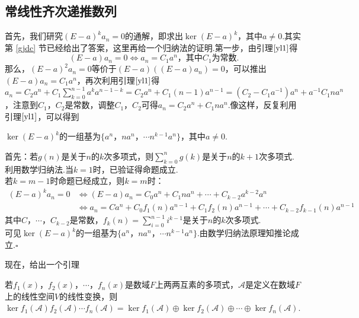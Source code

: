 \documentclass[10pt]{article}
\newcommand*{\QEDB}{\hfill\ensuremath{\square}}  %
\newcommand*{\D}{\text{，}}
\newcommand*{\SL}{\sum\limits}
\numberwithin{equation}{section}
\begin{document}
\subsection{常线性齐次递推数列}
\par 首先，我们研究$(E-a)^ka_n = 0$的通解，即求出$\ker (E-a)^k$，其中$a \ne 0$.其实第 \ref{gjdc} 节已经给出了答案，这里再给一个归纳法的证明.第一步，由引理$\ref{yl1}$得
$$
(E-a)a_n = 0 \Leftrightarrow a_n = C_1a^n \text{，其中$C_1$为常数.}
$$
那么，$(E-a)^2a_{n} = 0$等价于$(E-a)\left((E-a)a_n\right) = 0$，可以推出$(E-a)a_n = C_1a^n$，再次利用引理$\ref{yl1}$得$a_n = C_2a^n+C_1\SL_{k=0}^{n-1}{a^ka^{n-1-k}} = C_2a^n + C_1(n-1)a^{n-1} = (C_2-C_1a^{-1})a^{n} + a^{-1}C_1na^n$，注意到$C_1\D C_2$是常数，调整$C_1\D C_2$可得$a_n = C_2a^{n} + C_1na^{n}$.像这样，反复利用引理$\ref{yl1}$，可以得到
\begin{TL}
    $\ker (E-a)^k$的一组基为$\{a^n \D na^n \D \cdots n^{k-1}a^n\}$，其中$a\ne 0$.
\end{TL}
\begin{ZM}
    首先：若$g(n)$是关于$n$的$k$次多项式，则$\SL_{k=0}^{n}{g(k)}$是关于$n$的$k+1$次多项式.\\
    \indent 利用数学归纳法.当$k=1$时，已验证得命题成立.\\
    \indent 若$k=m-1$时命题已经成立，则$k=m$时：
    \[\begin{split}
            (E-a)^ka_n = 0 &\Leftrightarrow (E-a)a_n = C_0a^n+C_1na^n+\cdots+C_{k-2}a^{k-2}a^n \\
            &\Leftrightarrow a_n = Ca^n + C_0f_1(n)a^{n-1} + C_1f_2(n)a^{n-1}+ \cdots + C_{k-2}f_{k-1}(n)a^{n-1}
    \end{split}\]
    其中$C\D \cdots \D C_{k-2}$是常数，$f_{k}(n) = \SL_{i=0}^{n-1}{i^{k-1}}$是关于$n$的$k$次多项式.\\
    \indent 可见$\ker (E-a)^{k}$的一组基为$\{a^n \D na^n \D \cdots n^{k-1}a^n\}$.由数学归纳法原理知推论成立.\QEDB
\end{ZM}
现在，给出一个引理
\begin{YL}\label{yl2}
    若$f_1(x)\D f_2(x)\D \cdots\D f_n(x)$是数域$F$上两两互素的多项式，$\mathscr{A}$是定义在数域$F$上的线性空间$V$的线性变换，则$\ker f_1({\mathscr{A}})f_2({\mathscr{A}})\cdots f_n({\mathscr{A}}) = \ker f_1({\mathscr{A}}) \oplus \ker f_2({\mathscr{A}}) \oplus \cdots \oplus \ker f_n({\mathscr{A}})$.
\end{YL}
\end{document}
